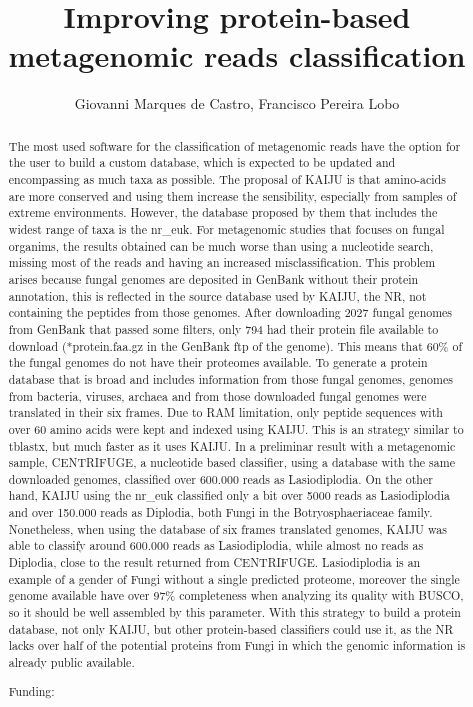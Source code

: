 \documentclass[twoside]{article}
\title{\vspace{-15mm}\fontsize{24pt}{10pt}\selectfont\textbf{ Improving protein-based metagenomic reads classification }} %
\author{ Giovanni Marques de Castro, Francisco Pereira Lobo }
\affil{ Universidade Federal de Minas Gerais }
\date{}
\begin{document}
  
  
  \maketitle %
  
  
  \thispagestyle{fancy} %
  
  
  \begin{abstract}
  The most used software for the classification of metagenomic reads have the option for the user to build a custom database,  which is expected to be updated and encompassing as much taxa as possible. The proposal of KAIJU is that amino-acids are more conserved and using them increase the sensibility,  especially from samples of extreme environments. However,  the database proposed by them that includes the widest range of taxa is the nr\_euk. For metagenomic studies that focuses on fungal organims,  the results obtained can be much worse than using a nucleotide search,  missing most of the reads and having an increased misclassification. This problem arises because fungal genomes are deposited in GenBank without their protein annotation,  this is reflected in the source database used by KAIJU,  the NR,  not containing the peptides from those genomes. After downloading 2027 fungal genomes from GenBank that passed some filters,  only 794 had their protein file available to download (*protein.faa.gz in the GenBank ftp of the genome). This means that 60\% of the fungal genomes do not have their proteomes available. To generate a protein database that is broad and includes information from those fungal genomes,  genomes from bacteria,  viruses,  archaea and from those downloaded fungal genomes were translated in their six frames. Due to RAM limitation,  only peptide sequences with over 60 amino acids were kept and indexed using KAIJU. This is an strategy similar to tblastx,  but much faster as it uses KAIJU. In a preliminar result with a metagenomic sample,  CENTRIFUGE,  a nucleotide based classifier,  using a database with the same downloaded genomes,  classified over 600.000 reads as Lasiodiplodia. On the other hand,  KAIJU using the nr\_euk classified only a bit over 5000 reads as Lasiodiplodia and over 150.000 reads as Diplodia,  both Fungi in the Botryosphaeriaceae family. Nonetheless,  when using the database of six frames translated genomes,  KAIJU was able to classify around 600.000 reads as Lasiodiplodia,  while almost no reads as Diplodia,  close to the result returned from CENTRIFUGE. Lasiodiplodia is an example of a gender of Fungi without a single predicted proteome,  moreover the single genome available have over 97\% completeness when analyzing its quality with BUSCO,  so it should be well assembled by this parameter. With this strategy to build a protein database,  not only KAIJU,  but other protein-based classifiers could use it,  as the NR lacks over half of the potential proteins from Fungi in which the genomic information is already public available.
  
  Funding:  \\ 
  \end{abstract}
  
\end{document}

